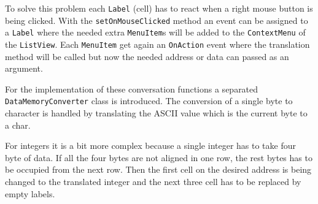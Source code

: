 To solve this problem each \lstinline$Label$ (cell) has to react when a right mouse button is being clicked. With the \lstinline$setOnMouseClicked$ method an event can be assigned to a \lstinline$Label$ where the needed extra \lstinline$MenuItem$s will be added to the \lstinline$ContextMenu$ of the \lstinline$ListView$. Each \lstinline$MenuItem$ get again an \lstinline$OnAction$ event where the translation method will be called but now the needed address or data can passed as an argument. 

For the implementation of these conversation functions a separated \lstinline$DataMemoryConverter$ class is introduced. The conversion of a single byte to character is handled by translating the ASCII value which is the current byte to a char. 

For integers it is a bit more complex because a single integer has to take four byte of data. If all the four bytes are not aligned in one row, the rest bytes has to be occupied from the next row. Then the first cell on the desired address is being changed to the translated integer and the next three cell has to be replaced by empty labels.